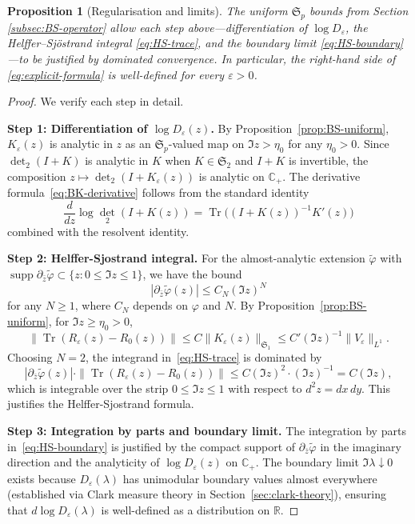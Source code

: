 ﻿\documentclass[12pt,a4paper]{article}
\newtheorem{proposition}[theorem]{Proposition}
\theoremstyle{definition}
\theoremstyle{remark}
\newcommand{\CC}{\mathbb{C}}
\newcommand{\RR}{\mathbb{R}}
\newcommand{\Tr}{\operatorname{Tr}}
\newcommand{\supp}{\operatorname{supp}}
\begin{document}
\begin{proposition}[Regularisation and limits]\label{prop:BK-limits}
The uniform $\mathfrak{S}_p$ bounds from Section\,\ref{subsec:BS-operator} allow each step above---differentiation of $\log D_\varepsilon$, the Helffer--Sj\"ostrand integral \eqref{eq:HS-trace}, and the boundary limit \eqref{eq:HS-boundary}---to be justified by dominated convergence.  In particular, the right-hand side of\,\eqref{eq:explicit-formula} is well-defined for every $\varepsilon>0$.
\end{proposition}

\begin{proof}
We verify each step in detail.

\textbf{Step 1: Differentiation of $\log D_\varepsilon(z)$.}
By Proposition~\ref{prop:BS-uniform}, $K_\varepsilon(z)$ is analytic in $z$ as an $\mathfrak{S}_p$-valued map on $\Im z > \eta_0$ for any $\eta_0 > 0$. Since $\det_2(I + K)$ is analytic in $K$ when $K \in \mathfrak{S}_2$ and $I + K$ is invertible, the composition $z \mapsto \det_2(I + K_\varepsilon(z))$ is analytic on $\CC_+$. The derivative formula~\eqref{eq:BK-derivative} follows from the standard identity
\[
  \frac{d}{dz} \log \det_2(I + K(z)) = \Tr\bigl((I + K(z))^{-1} K'(z)\bigr)
\]
combined with the resolvent identity.

\textbf{Step 2: Helffer-Sjostrand integral.}
For the almost-analytic extension $\tilde{\varphi}$ with $\supp \partial_{\bar z} \tilde{\varphi} \subset \{z : 0 \leq \Im z \leq 1\}$, we have the bound
\[
  |\partial_{\bar z} \tilde{\varphi}(z)| \leq C_N (\Im z)^N
\]
for any $N \geq 1$, where $C_N$ depends on $\varphi$ and $N$. By Proposition~\ref{prop:BS-uniform}, for $\Im z \geq \eta_0 > 0$,
\[
  \|\Tr(R_\varepsilon(z) - R_0(z))\| \leq C \|K_\varepsilon(z)\|_{\mathfrak{S}_1} \leq C' (\Im z)^{-1} \|V_\varepsilon\|_{L^1}.
\]
Choosing $N = 2$, the integrand in~\eqref{eq:HS-trace} is dominated by
\[
  |\partial_{\bar z} \tilde{\varphi}(z)| \cdot \|\Tr(R_\varepsilon(z) - R_0(z))\| \leq C (\Im z)^2 \cdot (\Im z)^{-1} = C (\Im z),
\]
which is integrable over the strip $0 \leq \Im z \leq 1$ with respect to $d^2z = dx \, dy$. This justifies the Helffer-Sjostrand formula.

\textbf{Step 3: Integration by parts and boundary limit.}
The integration by parts in~\eqref{eq:HS-boundary} is justified by the compact support of $\partial_{\bar z} \tilde{\varphi}$ in the imaginary direction and the analyticity of $\log D_\varepsilon(z)$ on $\CC_+$. The boundary limit $\Im \lambda \downarrow 0$ exists because $D_\varepsilon(\lambda)$ has unimodular boundary values almost everywhere (established via Clark measure theory in Section~\ref{sec:clark-theory}), ensuring that $d \log D_\varepsilon(\lambda)$ is well-defined as a distribution on $\RR$.


\end{proof}
\end{document}
